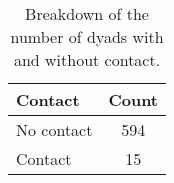 \begin{table}
\centering
\caption{Breakdown of the number of dyads with and without contact.}
\label{tab:counts_dyads_contacts}
\begin{tabular}{lc}
\toprule
Contact & Count \\
\midrule
No contact & 594 \\
Contact & 15 \\
\bottomrule
\end{tabular}
\end{table}
